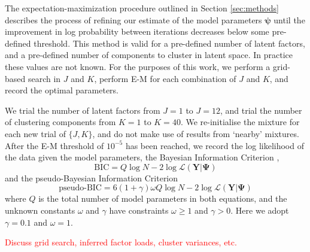 \documentclass[twocolumn]{aastex61}
\newcommand{\todo}[1]{\textcolor{red}{#1}}
\newcommand{\vect}[1]{\boldsymbol{\mathbf{#1}}}
\renewcommand{\vec}[1]{\vect{#1}}
\newcommand{\data}{\textbf{Y}}
\begin{document}
The expectation-maximization procedure outlined in Section \ref{sec:methods} describes 
the process of refining our estimate of the model parameters $\vec\psi$ until
the improvement in log probability between iterations decreases below some
pre-defined threshold. This method is valid for a pre-defined number of latent
factors, and a pre-defined number of components to cluster in latent space.
In practice these values are not known. For the purposes of this work, we 
perform a grid-based search in $J$ and $K$, perform E-M for each combination of
$J$ and $K$, and record the optimal parameters.

We trial the number of latent factors from $J = 1$ to $J = 12$, and trial the
number of clustering components from $K = 1$ to $K = 40$. We re-initialise the
mixture for each new trial of $\{J, K\}$, and do not make use of results from
`nearby' mixtures. After the E-M threshold of $10^{-5}$ has been reached, we
record the log likelihood of the data given the model parameters, the
Bayesian Information Criterion \citep{bic}, 
\begin{equation}
	\textrm{BIC} = Q\log{N} - 2\log\mathcal{L}\left(\data|\vec\Psi\right) \label{eq:bic}
\end{equation} 
\noindent{}and the pseudo-Bayesian Information Criterion \citep{pseudo-bic}
\begin{equation}
 \textrm{pseudo-BIC} = 6(1 + \gamma)\omega{}Q\log{N} - 2\log\mathcal{L}\left(\data|\vec\Psi\right) \label{eq:pseudo-bic}
\end{equation}
\noindent{}where $Q$ is the total number of model parameters in both equations,
and the unknown constants $\omega$ and $\gamma$ have constraints
$\omega \geq 1$ and $\gamma > 0$. Here we adopt $\gamma = 0.1$ and $\omega = 1$.


\todo{Discuss grid search, inferred factor loads, cluster variances, etc.}
\end{document}
